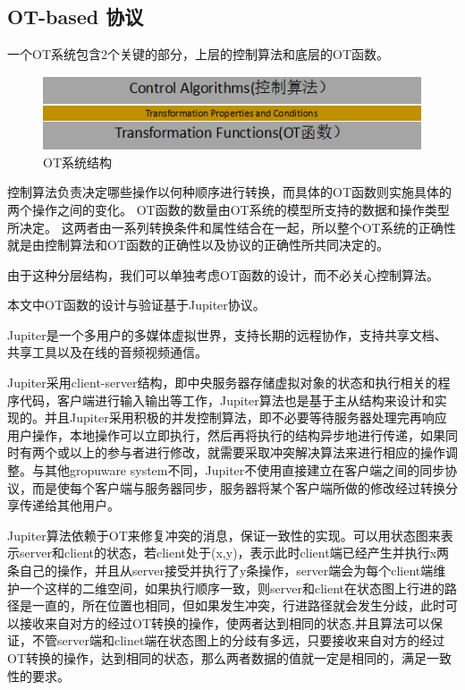 \subsection{OT-based 协议}
一个OT系统包含2个关键的部分，上层的控制算法和底层的OT函数。
\begin{figure}[H]
\centering
\includegraphics{figures/structure.bmp}
\caption{OT系统结构}
\end{figure}

控制算法负责决定哪些操作以何种顺序进行转换，而具体的OT函数则实施具体的两个操作之间的变化。
OT函数的数量由OT系统的模型所支持的数据和操作类型所决定。
这两者由一系列转换条件和属性结合在一起，所以整个OT系统的正确性就是由控制算法和OT函数的正确性以及协议的正确性所共同决定的。

由于这种分层结构，我们可以单独考虑OT函数的设计，而不必关心控制算法。

本文中OT函数的设计与验证基于Jupiter协议\cite{nichols1995high-latency}。

Jupiter是一个多用户的多媒体虚拟世界，支持长期的远程协作，支持共享文档、共享工具以及在线的音频视频通信。

Jupiter采用client-server结构，即中央服务器存储虚拟对象的状态和执行相关的程序代码，客户端进行输入输出等工作，Jupiter算法也是基于主从结构来设计和实现的。并且Jupiter采用积极的并发控制算法，即不必要等待服务器处理完再响应用户操作，本地操作可以立即执行，然后再将执行的结构异步地进行传递，如果同时有两个或以上的参与者进行修改，就需要采取冲突解决算法来进行相应的操作调整。与其他gropuware system不同，Jupiter不使用直接建立在客户端之间的同步协议，而是使每个客户端与服务器同步，服务器将某个客户端所做的修改经过转换分享传递给其他用户。

Jupiter算法依赖于OT来修复冲突的消息，保证一致性的实现。可以用状态图来表示server和client的状态，若client处于(x,y)，表示此时client端已经产生并执行x两条自己的操作，并且从server接受并执行了y条操作，server端会为每个client端维护一个这样的二维空间，如果执行顺序一致，则server和client在状态图上行进的路径是一直的，所在位置也相同，但如果发生冲突，行进路径就会发生分歧，此时可以接收来自对方的经过OT转换的操作，使两者达到相同的状态,并且算法可以保证，不管server端和clinet端在状态图上的分歧有多远，只要接收来自对方的经过OT转换的操作，达到相同的状态，那么两者数据的值就一定是相同的，满足一致性的要求。

